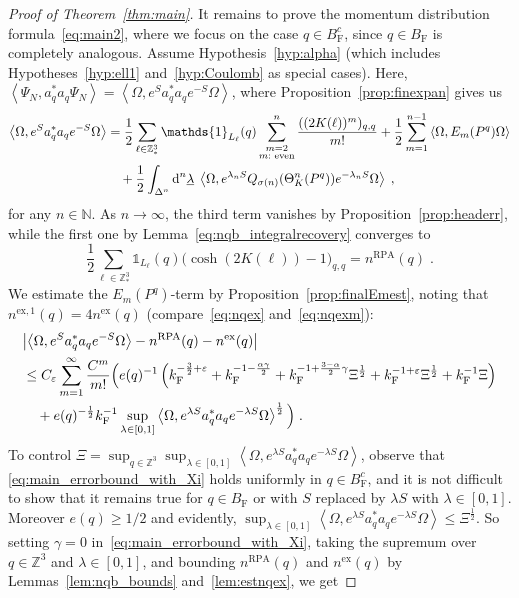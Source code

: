 \documentclass[12pt,a4paper]{article}
\numberwithin{equation}{section}
\newcommand{\1}{\mathbb{I}}
\newcommand{\di}{\textnormal{d}}
\newcommand{\ex}{\mathrm{ex}}
\newcommand{\F}{\mathrm{F}}
\newcommand{\RPA}{\mathrm{RPA}}
\newcommand{\N}{\mathbb{N}}
\newcommand{\Z}{\mathbb{Z}}
\newcommand{\half}{\frac{1}{2}}
\newcommand{\eva}[1]{\left\langle #1 \right\rangle}
\theoremstyle{plain}
\theoremstyle{definition}
\theoremstyle{remark}
\theoremstyle{plain}
\theoremstyle{definition}
\theoremstyle{remark}
\begin{document}
\begin{proof}[Proof of Theorem~\ref{thm:main}]
It remains to prove the momentum distribution formula~\eqref{eq:main2}, where we focus on the case $ q \in B_{\F}^c $, since $ q \in B_{\F} $ is completely analogous. Assume Hypothesis~\ref{hyp:alpha} (which includes Hypotheses~\ref{hyp:ell1} and~\ref{hyp:Coulomb} as special cases). Here, $ \eva{\Psi_N, a_q^* a_q \Psi_N} = \eva{\Omega, e^{S} a_q^* a_q e^{-S} \Omega} $, where Proposition~\ref{prop:finexpan} gives us
\begin{align*}
	\eva{\Omega, e^{S} a_q^* a_q e^{-S} \Omega} 
	&= \half\sum_{\ell\in \Z^3_*}\mathds{1}_{L_\ell}(q) \sum_{\substack{m=2\\m:\textnormal{ even}}}^n \frac{((2K(\ell))^m)_{q,q}}{m!}
		+ \half \sum_{m=1}^{n-1} \eva{\Omega, E_m(P^q)\Omega}\nonumber\\
	&\quad +\half \int_{\Delta^n} \di^n\underline{\lambda} \;
		\eva{\Omega, e^{\lambda_n S}Q_{\sigma(n)}(\Theta^n_{K}(P^q)) e^{-\lambda_n S} \Omega} \;,
\end{align*}
for any $ n \in \N $. As $ n \to \infty $, the third term vanishes by Proposition~\ref{prop:headerr}, while the first one by Lemma~\ref{eq:nqb_integralrecovery} converges to
\begin{equation*}
	\half\sum_{\ell\in \Z^3_*}\mathds{1}_{L_\ell}(q) \big( \cosh(2K(\ell)) - 1 \big)_{q,q}
	= n^{\RPA}(q) \;.
\end{equation*}
We estimate the $ E_m(P^q) $-term by Proposition~\ref{prop:finalEmest}, noting that $ n^{\ex,1}(q) = 4 n^{\ex}(q) $ (compare~\eqref{eq:nqex} and~\eqref{eq:nqexm}):
\begin{align} \label{eq:main_errorbound_with_Xi}
	& \abs{\eva{\Omega, e^{S} a_q^* a_q e^{-S} \Omega} - n^{\textnormal{RPA}}(q) - n^{\ex}(q)} \nonumber\\
	&\le C_\varepsilon \sum_{m=1}^\infty \frac{C^m}{m!}
		\Big( e(q)^{-1}\left( k_{\F}^{-\frac 32 + \varepsilon} 
		+ k_{\F}^{-1 - \frac{\alpha \gamma}{2}} 
		+ k_{\F}^{-1 + \frac{3-\alpha}{2} \gamma} \Xi^\half
		+ k_{\F}^{-1+\varepsilon} \Xi^\half
		+ k_{\F}^{-1} \Xi \right) \nonumber\\
	&\quad + e(q)^{-\half} k_{\F}^{-1} \sup_{\lambda \in [0,1]} \eva{\Omega, e^{\lambda S} a_q^* a_q e^{-\lambda S} \Omega}^{\half} \Big) \;.
\end{align}
To control $ \Xi = \sup_{q \in \Z^3} \sup_{\lambda \in [0,1]} \eva{\Omega, e^{\lambda S} a_q^* a_q e^{- \lambda S} \Omega} $, observe that \eqref{eq:main_errorbound_with_Xi} holds uniformly in $ q \in B_{\F}^c $, and it is not difficult to show that it remains true for $ q \in B_{\F} $ or with $ S $ replaced by $ \lambda S $ with $ \lambda \in [0,1] $. Moreover $ e(q) \ge 1/2 $ and evidently, $ \sup_{\lambda \in [0,1]} \eva{\Omega, e^{\lambda S} a_q^* a_q e^{-\lambda S} \Omega} \le \Xi^{\half} $. So setting $ \gamma = 0 $ in~\eqref{eq:main_errorbound_with_Xi}, taking the supremum over $ q \in \Z^3 $ and $ \lambda \in [0,1] $, and bounding $ n^{\RPA}(q) $ and $ n^{\ex}(q) $ by Lemmas~\ref{lem:nqb_bounds} and~\ref{lem:estnqex}, we get

\end{proof}
\end{document}
